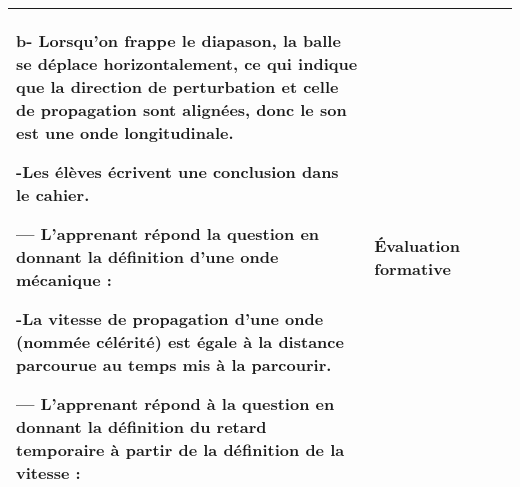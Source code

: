 \documentclass[12pt]{article}
\begin{document}
\begin{center}
\begin{tabular}{|p{}||p{}||p{}||p{}|}
b- Lorsqu’on frappe le diapason, la balle se déplace
horizontalement, ce qui indique
que la direction de perturbation et celle de
propagation sont alignées, donc le son
est une onde longitudinale.
\vspace{0.5cm}

-Les élèves écrivent une conclusion dans le cahier.
\vspace{0.5cm}


--- L’apprenant répond la question en donnant la
définition d’une onde mécanique :

-\textbf{La vitesse de propagation} d’une onde (nommée célérité) est égale à la distance parcourue au temps mis
à la parcourir.

--- L'apprenant répond à la question en donnant la définition du retard temporaire à partir de la définition de la vitesse :
				  & 
	Évaluation formative\\\hline 
\end{tabular}
\end{center}
\end{document}
